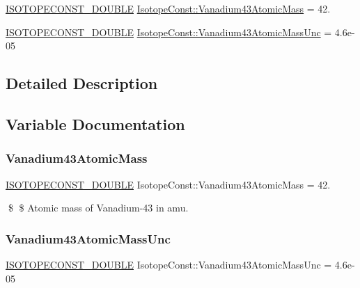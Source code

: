 \begin{DoxyCompactItemize}
\item 
\mbox{\hyperlink{group___isotope_const-_macros_ga8f45a7272ce02c0b4c65c44636ed719a}{I\+S\+O\+T\+O\+P\+E\+C\+O\+N\+S\+T\+\_\+\+D\+O\+U\+B\+LE}} \mbox{\hyperlink{group___isotope_const-_vanadium-_v43_ga151bf06926a09ee9df75ae9cee878663}{Isotope\+Const\+::\+Vanadium43\+Atomic\+Mass}} = 42.
\item 
\mbox{\hyperlink{group___isotope_const-_macros_ga8f45a7272ce02c0b4c65c44636ed719a}{I\+S\+O\+T\+O\+P\+E\+C\+O\+N\+S\+T\+\_\+\+D\+O\+U\+B\+LE}} \mbox{\hyperlink{group___isotope_const-_vanadium-_v43_ga8a04635e388c4490b3895b449e956bf7}{Isotope\+Const\+::\+Vanadium43\+Atomic\+Mass\+Unc}} = 4.\+6e-\/05
\end{DoxyCompactItemize}


\subsection{Detailed Description}


\subsection{Variable Documentation}
\mbox{\label{group___isotope_const-_vanadium-_v43_ga151bf06926a09ee9df75ae9cee878663}} 
\subsubsection{\texorpdfstring{Vanadium43\+Atomic\+Mass}{Vanadium43AtomicMass}}
{\footnotesize\ttfamily \mbox{\hyperlink{group___isotope_const-_macros_ga8f45a7272ce02c0b4c65c44636ed719a}{I\+S\+O\+T\+O\+P\+E\+C\+O\+N\+S\+T\+\_\+\+D\+O\+U\+B\+LE}} Isotope\+Const\+::\+Vanadium43\+Atomic\+Mass = 42.}

\$ \$ Atomic mass of Vanadium-\/43 in amu. \mbox{\label{group___isotope_const-_vanadium-_v43_ga8a04635e388c4490b3895b449e956bf7}} 
\subsubsection{\texorpdfstring{Vanadium43\+Atomic\+Mass\+Unc}{Vanadium43AtomicMassUnc}}
{\footnotesize\ttfamily \mbox{\hyperlink{group___isotope_const-_macros_ga8f45a7272ce02c0b4c65c44636ed719a}{I\+S\+O\+T\+O\+P\+E\+C\+O\+N\+S\+T\+\_\+\+D\+O\+U\+B\+LE}} Isotope\+Const\+::\+Vanadium43\+Atomic\+Mass\+Unc = 4.\+6e-\/05}

